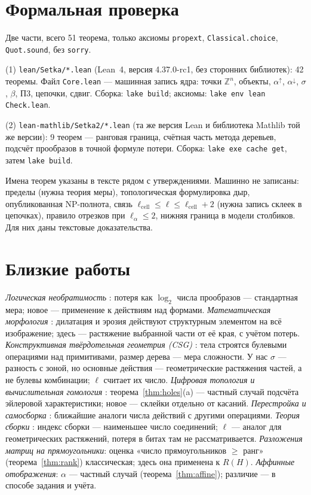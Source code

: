 \documentclass[11pt,a4paper]{article}
\theoremstyle{plain}
\theoremstyle{definition}
\theoremstyle{remark}
\newcommand{\Z}{\mathbb{Z}}
\newcommand{\lc}{\ell_{\mathrm{cell}}}
\begin{document}
\section{Формальная проверка}

Две части, всего 51 теорема, только аксиомы \texttt{propext}, \texttt{Classical.choice}, \texttt{Quot.sound}, без \texttt{sorry}.

(1) \texttt{lean/Setka/*.lean} (Lean~4, версия 4.37.0-rc1, без сторонних библиотек): 42 теоремы. Файл \texttt{Core.lean} — машинная запись ядра: точки $\Z^n$, объекты, $\alpha^\uparrow$, $\alpha^\downarrow$, $\sigma$, $\beta$, П3, цепочки, сдвиг. Сборка: \texttt{lake build}; аксиомы: \texttt{lake env lean Check.lean}.

(2) \texttt{lean-mathlib/Setka2/*.lean} (та же версия Lean и библиотека Mathlib той же версии): 9 теорем — ранговая граница, счётная часть метода деревьев, подсчёт прообразов в точной формуле потери. Сборка: \texttt{lake exe cache get}, затем \texttt{lake build}.

Имена теорем указаны в тексте рядом с утверждениями. Машинно не записаны: пределы (нужна теория меры), топологическая формулировка дыр, опубликованная NP-полнота, связь $\lc\le\ell\le\lc+2$ (нужна запись склеек в цепочках), правило отрезков при $\ell_\alpha\le2$, нижняя граница в модели столбиков. Для них даны текстовые доказательства.

\section{Близкие работы}\label{sec:related}

\emph{Логическая необратимость} \cite{landauer,frank}: потеря как $\log_2$ числа прообразов — стандартная мера; новое — применение к действиям над формами.
\emph{Математическая морфология} \cite{serra}: дилатация и эрозия действуют структурным элементом на всё изображение; здесь — растяжение выбранной части от её края, с учётом потерь.
\emph{Конструктивная твёрдотельная геометрия (CSG)} \cite{requicha}: тела строятся булевыми операциями над примитивами, размер дерева — мера сложности. У нас $\sigma$ — разность с зоной, но основные действия — геометрические растяжения частей, а не булевы комбинации; $\ell$ считает их число.
\emph{Цифровая топология и вычислительная гомология} \cite{kong,kaczynski,toriwaki}: теорема~\ref{thm:holes}(a) — частный случай подсчёта эйлеровой характеристики; новое — склейки отдельно от касаний.
\emph{Перестройка и самосборка} \cite{akitaya,soloveichik}: ближайшие аналоги числа действий с другими операциями.
\emph{Теория сборки} \cite{assembly}: индекс сборки — наименьшее число соединений; $\ell$ — аналог для геометрических растяжений, потеря в битах там не рассматривается.
\emph{Разложения матриц на прямоугольники}: оценка «число прямоугольников $\ge$ ранг» (теорема~\ref{thm:rank}) классическая; здесь она применена к $R(H)$.
\emph{Аффинные отображения}: $\alpha$ — частный случай (теорема~\ref{thm:affine}); различие — в способе задания и учёта.
\end{document}
